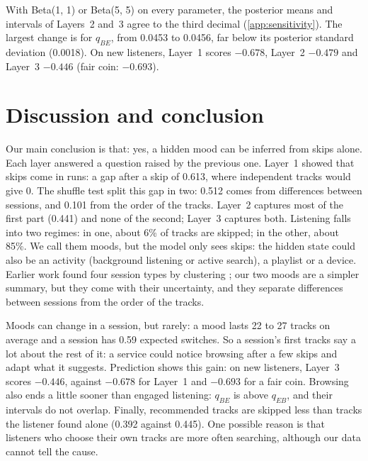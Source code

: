 \documentclass[12pt]{article}
\begin{document}
With Beta(1, 1) or Beta(5, 5) on every parameter, the posterior means and intervals of Layers~2 and~3 agree to the third decimal (\cref{app:sensitivity}). The largest change is for $q_{BE}$, from 0.0453 to 0.0456, far below its posterior standard deviation (0.0018). On new listeners, Layer~1 scores $-0.678$, Layer~2 $-0.479$ and Layer~3 $-0.446$ (fair coin: $-0.693$).

\section{Discussion and conclusion}\label{sec:discussion}

Our main conclusion is that: yes, a hidden mood can be inferred from skips alone. Each layer answered a question raised by the previous one. Layer~1 showed that skips come in runs: a gap after a skip of 0.613, where independent tracks would give 0. The shuffle test split this gap in two: 0.512 comes from differences between sessions, and 0.101 from the order of the tracks. Layer~2 captures most of the first part (0.441) and none of the second; Layer~3 captures both. Listening falls into two regimes: in one, about 6\% of tracks are skipped; in the other, about 85\%. We call them moods, but the model only sees skips: the hidden state could also be an activity (background listening or active search), a playlist or a device. Earlier work found four session types by clustering \citep{meggetto2021skipping}; our two moods are a simpler summary, but they come with their uncertainty, and they separate differences between sessions from the order of the tracks.

Moods can change in a session, but rarely: a mood lasts 22 to 27 tracks on average and a session has 0.59 expected switches. So a session's first tracks say a lot about the rest of it: a service could notice browsing after a few skips and adapt what it suggests. Prediction shows this gain: on new listeners, Layer~3 scores $-0.446$, against $-0.678$ for Layer~1 and $-0.693$ for a fair coin. Browsing also ends a little sooner than engaged listening: $q_{BE}$ is above $q_{EB}$, and their intervals do not overlap. Finally, recommended tracks are skipped less than tracks the listener found alone (0.392 against 0.445). One possible reason is that listeners who choose their own tracks are more often searching, although our data cannot tell the cause.
\end{document}
